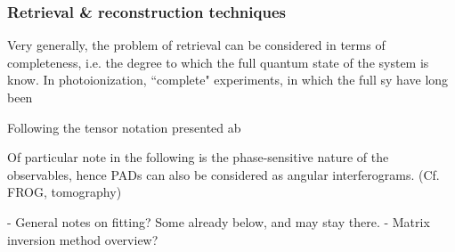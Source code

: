 \subsubsection{Retrieval \& reconstruction techniques}

Very generally, the problem of retrieval can be considered in terms of completeness, i.e. the degree to which the full quantum state of the system is know. In photoionization, ``complete" experiments, in which the full sy have long been

Following the tensor notation presented ab

Of particular note in the following is the phase-sensitive nature of the observables, hence PADs can also be considered as angular interferograms. (Cf. FROG, tomography)

- General notes on fitting? Some already below, and may stay there.
- Matrix inversion method overview?